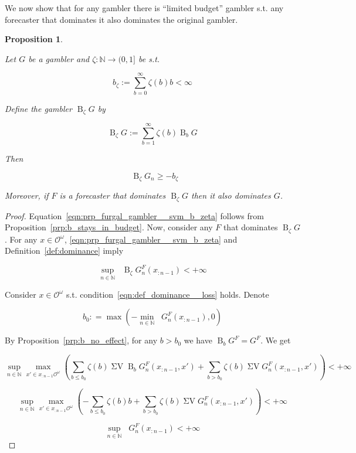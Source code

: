 \documentclass[11pt]{article}
\theoremstyle{definition}
\theoremstyle{plain}
\newtheorem{proposition}{Proposition}%
\newcommand{\Nats}{\mathbb{N}}
\newcommand{\B}{\operatorname{B}}
\newcommand{\Ob}{\mathcal{O}}
\newcommand{\OO}{\Ob^\omega}
\DeclareMathOperator{\SV}{\Sigma V}
\DeclareMathOperator{\SVM}{\Sigma V_{\min}}
\DeclareMathOperator{\SVX}{\Sigma V_{\max}}
\begin{document}
We now show that for any gambler there is \enquote{limited budget} gambler s.t. any forecaster that dominates it also dominates the original gambler.

\begin{proposition}
\label{prp:frugal_gambler}

Let $G$ be a gambler and $\zeta: \Nats \rightarrow (0,1]$ be s.t.

\begin{equation}
b_\zeta := \sum_{b=0}^\infty \zeta(b) b < \infty
\end{equation}

Define the gambler $\B_\zeta G$ by

\begin{equation}
\B_\zeta G := \sum_{b = 1}^\infty \zeta(b) \B_b G
\end{equation}

Then

\begin{equation}
\label{eqn:prp_furgal_gambler__svm_b_zeta}
\SVM \B_\zeta G_n \geq -b_\zeta
\end{equation}

Moreover, if $F$ is a forecaster that dominates $\B_\zeta G$ then it also dominates $G$.

\end{proposition}

\begin{proof}

Equation~\ref{eqn:prp_furgal_gambler__svm_b_zeta} follows from Proposition~\ref{prp:b_stays_in_budget}. Now, consider any $F$ that dominates $\B_\zeta G$. For any $x \in \OO$, \ref{eqn:prp_furgal_gambler__svm_b_zeta} and Definition~\ref{def:dominance} imply

\[\sup_{n \in \Nats} {\SVX \B_\zeta G^F_{n}(x_{:n-1})} < +\infty\]

Consider $x \in \OO$ s.t. condition~\ref{eqn:def_dominance__loss} holds. Denote

\[b_0: = \max( -\min_{n \in \Nats} {\SVM G^F_{n}(x_{:n-1})},0)\]

By Proposition~\ref{prp:b_no_effect}, for any $b > b_0$ we have $\B_bG^F = G^F$. We get

\[\sup_{n \in \Nats} \max_{x' \in x_{:n-1}\OO} (\sum_{b \leq b_0} \zeta(b) {\SV \B_b G^F_{n}(x_{:n-1},x')} + \sum_{b > b_0} \zeta(b) \SV G^F_{n}(x_{:n-1},x')) < +\infty\]

\[\sup_{n \in \Nats} \max_{x' \in x_{:n-1}\OO} (-\sum_{b \leq b_0} \zeta(b) b + \sum_{b > b_0} \zeta(b) \SV G^F_{n}(x_{:n-1},x')) < +\infty\]

\[\sup_{n \in \Nats} \SVX G^F_{n}(x_{:n-1}) < +\infty\]
\end{proof}
\end{document}
